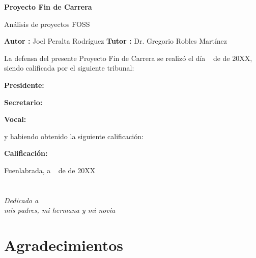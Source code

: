 \documentclass[a4paper, spanish, 12pt]{book}
\begin{document}
\vspace{-4cm}
\begin{center}
\LARGE
\textbf{Proyecto Fin de Carrera}

\vspace{1cm}
\large
An\'alisis de proyectos FOSS

\vspace{1cm}
\large
\textbf{Autor :} Joel Peralta Rodr\'iguez
\textbf{Tutor :} Dr. Gregorio Robles Mart\'inez

\end{center}

\vspace{1cm}
La defensa del presente Proyecto Fin de Carrera se realiz\'o el d\'ia \qquad$\;\,$ de \qquad\qquad\qquad\qquad \newline de 20XX, siendo calificada por el siguiente tribunal:


\vspace{0.5cm}
\textbf{Presidente:}

\vspace{1.2cm}
\textbf{Secretario:}

\vspace{1.2cm}
\textbf{Vocal:}


\vspace{1.2cm}
y habiendo obtenido la siguiente calificaci\'on:

\vspace{1cm}
\textbf{Calificaci\'on:}


\vspace{1cm}
\begin{flushright}
Fuenlabrada, a \qquad$\;\,$ de \qquad\qquad\qquad\qquad de 20XX
\end{flushright}


\chapter*{}
\begin{flushright}
\textit{Dedicado a \\
mis padres, mi hermana y mi novia}
\end{flushright}


\chapter*{Agradecimientos}
\end{document}
